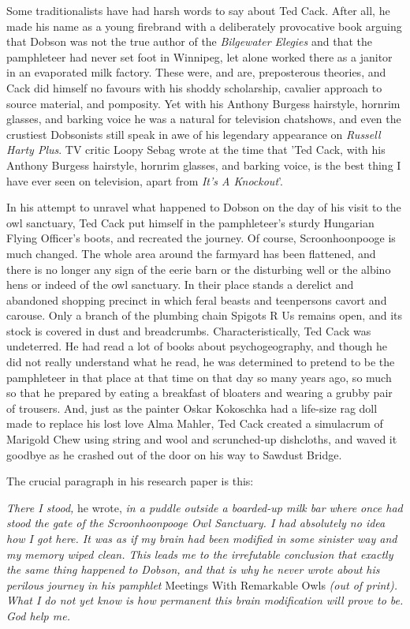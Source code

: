 Some traditionalists have had harsh words to say about Ted Cack. After all, he made his name as a young firebrand with a deliberately provocative book arguing that Dobson was not the true author of the \emph{Bilgewater Elegies} and that the pamphleteer had never set foot in Winnipeg, let alone worked there as a janitor in an evaporated milk factory. These were, and are, preposterous theories, and Cack did himself no favours with his shoddy scholarship, cavalier approach to source material, and pomposity. Yet with his Anthony Burgess hairstyle, hornrim glasses, and barking voice he was a natural for television chatshows, and even the crustiest Dobsonists still speak in awe of his legendary appearance on \emph{Russell Harty Plus}. TV critic Loopy Sebag wrote at the time that 'Ted Cack, with his Anthony Burgess hairstyle, hornrim glasses, and barking voice, is the best thing I have ever seen on television, apart from \emph{It's A Knockout}'.

In his attempt to unravel what happened to Dobson on the day of his visit to the owl sanctuary, Ted Cack put himself in the pamphleteer's sturdy Hungarian Flying Officer's boots, and recreated the journey. Of course, Scroonhoonpooge is much changed. The whole area around the farmyard has been flattened, and there is no longer any sign of the eerie barn or the disturbing well or the albino hens or indeed of the owl sanctuary. In their place stands a derelict and abandoned shopping precinct in which feral beasts and teenpersons cavort and carouse. Only a branch of the plumbing chain Spigots R Us remains open, and its stock is covered in dust and breadcrumbs. Characteristically, Ted Cack was undeterred. He had read a lot of books about psychogeography, and though he did not really understand what he read, he was determined to pretend to be the pamphleteer in that place at that time on that day so many years ago, so much so that he prepared by eating a breakfast of bloaters and wearing a grubby pair of trousers. And, just as the painter Oskar Kokoschka had a life-size rag doll made to replace his lost love Alma Mahler, Ted Cack created a simulacrum of Marigold Chew using string and wool and scrunched-up dishcloths, and waved it goodbye as he crashed out of the door on his way to Sawdust Bridge.

The crucial paragraph in his research paper is this:

\emph{There I stood,} he wrote, \emph{in a puddle outside a boarded-up milk bar where once had stood the gate of the Scroonhoonpooge Owl Sanctuary. I had absolutely no idea how I got here. It was as if my brain had been modified in some sinister way and my memory wiped clean. This leads me to the irrefutable conclusion that exactly the same thing happened to Dobson, and that is why he never wrote about his perilous journey in his pamphlet} Meetings With Remarkable Owls \emph{(out of print). What I do not yet know is how permanent this brain modification will prove to be. God help me.}


